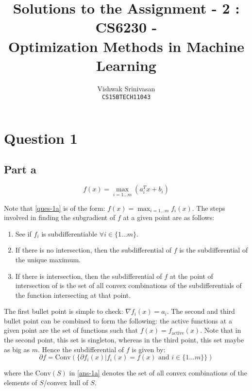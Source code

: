 \documentclass[11pt]{article}
\title{Solutions to the Assignment - 2 : CS6230 - \\
Optimization Methods in Machine Learning}
\author{Vishwak Srinivasan\\
\texttt{CS15BTECH11043}}
\date{}
\begin{document}
\maketitle

\section*{Question 1}
\subsection*{Part a}
\begin{flushleft}
\begin{equation}
\label{ques-1a}
\displaystyle f(x) = \max_{i=1\ldots m} (a_{i}^{T}x + b_{i})
\end{equation}

Note that \ref{ques-1a} is of the form: \(\displaystyle f(x) = \max_{i=1\ldots m} f_{i}(x)\). The steps involved in finding the subgradient of \(f\) at a given point are as follows:

\begin{enumerate}
\item See if \(f_{i}\) is subdifferentiable \(\forall i \in \{1 \ldots m\}\).
\item If there is no intersection, then the subdifferential of \(f\) is the subdifferential of the unique maximum.
\item If there is intersection, then the subdifferential of \(f\) at the point of intersection of is the set of all convex combinations of the subdifferentials of the function intersecting at that point.
\end{enumerate}

The first bullet point is simple to check: \(\nabla f_{i}(x) = a_{i}\). The second and third bullet point can be combined to form the following: the active functions at a given point are the set of functions such that \(f(x) = f_{\text{active}}(x)\). Note that in the second point, this set is singleton, whereas in the third point, this set maybe as big as \(m\). Hence the subdifferential of \(f\) is given by:
\begin{equation}
\label{ans-1a}
\partial f = \text{Conv}\left(\{\partial f_{i}(x) | f_{i}(x) = f(x) \text{ and } i \in \{1 \ldots m\}\}\right)
\end{equation}

where the \(\text{Conv}(S)\) in \ref{ans-1a} denotes the set of all convex combinations of the elements of \(S\)/convex hull of \(S\).
\end{flushleft}
\end{document}
